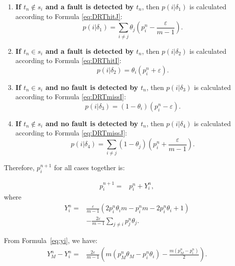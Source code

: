 \documentclass[10pt,journal,compsoc]{IEEEtran}
\begin{document}
\begin{enumerate}
  \item
  \textbf{If $t_{n} \notin s_i$ and a fault is detected by $t_n$}, then $p(i|\delta_1)$ is calculated according to Formula \ref{eq:DRThitJ}:
    $$p(i|\delta_1) = \sum_{i \neq j}\theta_j(p_i^n - \displaystyle\frac{\varepsilon}{m - 1}).$$

  \item
  \textbf{If $t_{n} \in s_i$ and a fault is detected by $t_n$}, then $p(i|\delta_2)$ is calculated according to Formula \ref{eq:DRThitI}:
    $$p(i|\delta_2) = \theta_i(p_i^n + \varepsilon).$$

  \item
  \textbf{If $t_{n} \in s_i$ and no fault is detected by $t_n$}, then $p(i|\delta_3)$ is calculated according to Formula \ref{eq:DRTmissI}:
    $$p(i|\delta_3) = (1 - \theta_i)(p_i^n - \varepsilon).$$

  \item
  \textbf{If $t_{n} \notin s_i$ and no fault is detected by $t_n$}, then $p(i|\delta_4)$ is calculated according to Formula \ref{eq:DRTmissJ}:
    $$p(i|\delta_4) = \sum_{i \neq j}(1 - \theta_j)(p_i^n + \displaystyle\frac{\varepsilon}{m - 1}).$$
\end{enumerate}

Therefore, $p_i^{n + 1}$ for all cases together is:

\begin{equation}
    \label{eq:7}
    \begin{split}
    p_i^{n + 1}
    =&p_i^n + Y_i^n,
    \end{split}
\end{equation}
where
\begin{equation}
    \begin{split}
    \label{eq:yi}
    Y_i^n = &\displaystyle\frac{\varepsilon}{m - 1}(2p_i^n\theta_im - p_i^nm - 2p_i^n\theta_i + 1 )\\
             &- \displaystyle\frac{2\varepsilon}{m-1}\sum_{j \neq i}p_j^n\theta_j.
    \end{split}
 \end{equation}

From Formula~\ref{eq:yi}, we have:
 \begin{equation}
    \begin{split}
    \label{eq:26}
    Y_M^n - Y_i^n
    =&\displaystyle\frac{2\varepsilon}{m - 1}(m(p_M^n\theta_M - p_i^n\theta_i) - \displaystyle\frac{m(p_M^n - p_i^n)}{2}).
    \end{split}
\end{equation}
\end{document}
